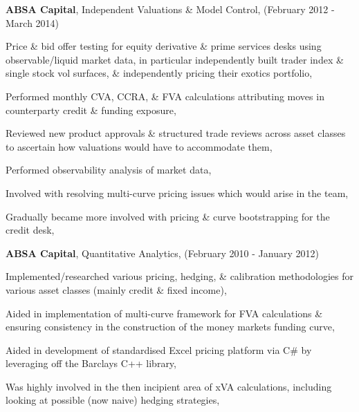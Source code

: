 \documentclass[11pt]{article}
\newenvironment{outerlist}[1][\enskip\textbullet]%
        {\begin{itemize}[#1]}{\end{itemize}%
         \vspace{-.6\baselineskip}}
\newenvironment{innerlist}[1][\enskip\textbullet]%
        {\begin{compactitem}[#1]}{\end{compactitem}}
\begin{document}
\begin{outerlist}
		\item[] \textbf{\textcolor{customaqua}{ABSA Capital}}, Independent Valuations \& Model Control,
			   (February 2012 - March 2014)
			\begin{innerlist}
				\item Price \& bid offer testing for equity derivative \& prime services desks using 
					 observable/liquid market data, in particular independently built trader index \& 
					 single stock vol surfaces, \& independently pricing their exotics portfolio,
				\item Performed monthly CVA, CCRA, \& FVA calculations attributing moves in counterparty 
					 credit \& funding exposure,
				\item Reviewed new product approvals \& structured trade reviews across asset classes to 
					 ascertain how valuations would have to accommodate them,
				\item Performed observability analysis of market data,
				\item Involved with resolving multi-curve pricing issues which would arise in the team,
				\item Gradually became more involved with pricing \& curve bootstrapping for the credit
					 desk,
			\end{innerlist}
					
					
	\item[] \textbf{\textcolor{customaqua}{ABSA Capital}}, Quantitative Analytics, 
		   (February 2010 - January 2012) 
		\begin{innerlist}
			\item Implemented/researched various pricing, hedging, \& calibration methodologies for
				 various asset classes (mainly credit \& fixed income),
			\item Aided in implementation of multi-curve framework for FVA calculations \& ensuring 
				 consistency in the construction of the money markets funding curve,
			\item Aided in development of standardised Excel pricing platform via C\# by leveraging off 
				 the Barclays C++ library,
			\item Was highly involved in the then incipient area of xVA calculations, including looking 
				 at possible (now naive) hedging strategies,
		\end{innerlist}
\end{outerlist}
\end{document}
